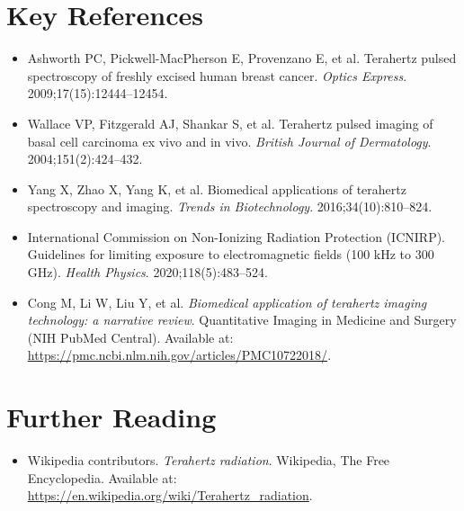 \section{Key References}
\begin{itemize}
  \item Ashworth PC, Pickwell-MacPherson E, Provenzano E, et al. Terahertz pulsed spectroscopy of freshly excised human breast cancer. \textit{Optics Express}. 2009;17(15):12444--12454.
  \item Wallace VP, Fitzgerald AJ, Shankar S, et al. Terahertz pulsed imaging of basal cell carcinoma ex vivo and in vivo. \textit{British Journal of Dermatology}. 2004;151(2):424--432.
  \item Yang X, Zhao X, Yang K, et al. Biomedical applications of terahertz spectroscopy and imaging. \textit{Trends in Biotechnology}. 2016;34(10):810--824.
  \item International Commission on Non-Ionizing Radiation Protection (ICNIRP). Guidelines for limiting exposure to electromagnetic fields (100 kHz to 300 GHz). \textit{Health Physics}. 2020;118(5):483--524.
  \item Cong M, Li W, Liu Y, et al. \textit{Biomedical application of terahertz imaging technology: a narrative review}. Quantitative Imaging in Medicine and Surgery (NIH PubMed Central). Available at: \url{https://pmc.ncbi.nlm.nih.gov/articles/PMC10722018/}.
\end{itemize}

\section{Further Reading}
\begin{itemize}
  \item Wikipedia contributors. \textit{Terahertz radiation}. Wikipedia, The Free Encyclopedia. Available at: \url{https://en.wikipedia.org/wiki/Terahertz_radiation}.
\end{itemize}
